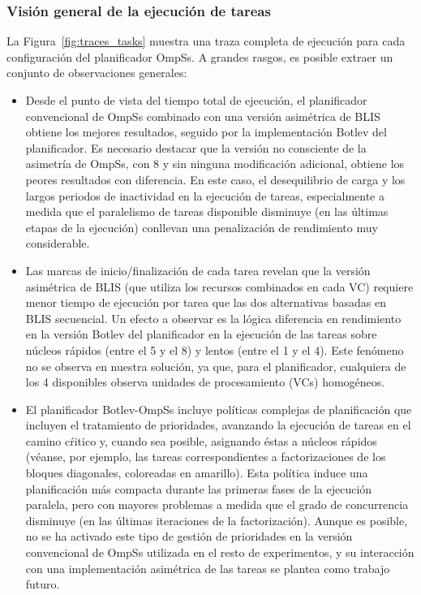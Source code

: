 \subsubsection{Visión general de la ejecución de tareas}

La Figura~\ref{fig:traces_tasks} muestra una traza completa de ejecución para cada configuración del planificador OmpSs. A grandes rasgos, es posible
extraer un conjunto de observaciones generales:

\begin{itemize}
\item Desde el punto de vista del tiempo total de ejecución, el planificador convencional de OmpSs combinado con una versión asimétrica
	de BLIS obtiene los mejores resultados, seguido por la implementación Botlev del planificador. Es necesario destacar que
		la versión no consciente de la asimetría de OmpSs, con 8 \wt y sin ninguna modificación adicional, obtiene los peores
		resultados con diferencia. En este caso, el desequilibrio de carga y los largos periodos de inactividad en la
		ejecución de tareas, especialmente a medida que el paralelismo de tareas disponible disminuye (en las últimas etapas
		de la ejecución) conllevan una penalización de rendimiento muy considerable.

\item Las marcas de inicio/finalización de cada tarea revelan que la versión asimétrica de BLIS (que utiliza los recursos combinados
	en cada VC) requiere menor tiempo de ejecución por tarea que las dos alternativas basadas en BLIS secuencial. Un efecto a observar
		es la lógica diferencia en rendimiento en la versión Botlev del planificador en la ejecución de las tareas sobre núcleos
		rápidos (\wts entre el 5 y el 8) y lentos (\wts entre el 1 y el 4). Este fenómeno no se observa en nuestra solución, ya
		que, para el planificador, cualquiera de los 4 \wts disponibles observa unidades de procesamiento (VCs) homogéneos.

\item El planificador Botlev-OmpSs incluye políticas complejas de planificación que incluyen el tratamiento de prioridades,
	avanzando la ejecución de tareas en el camino cŕitico y, cuando sea posible, asignando éstas a núcleos rápidos (véanse,
		por ejemplo, las tareas correspondientes a factorizaciones de los bloques diagonales, coloreadas en amarillo). Esta
		política induce una planificación más compacta durante las primeras fases de la ejecución paralela, pero 
		con mayores problemas a medida que el grado de concurrencia disminuye (en las últimas iteraciones de la 
		factorización). Aunque es posible, no se ha activado este tipo de gestión de prioridades en la versión convencional
		de OmpSs utilizada en el resto de experimentos, y su interacción con una implementación asimétrica de las tareas
		se plantea como trabajo futuro.
\end{itemize}


